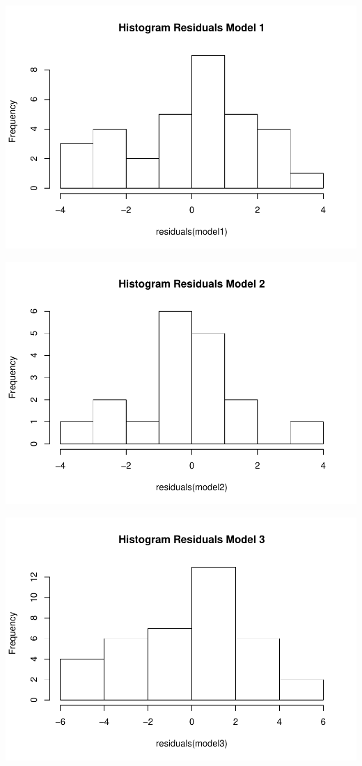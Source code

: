 \documentclass[]{elsarticle} %
\makeatletter
\def\maxwidth{\ifdim\Gin@nat@width>\linewidth\linewidth
\else\Gin@nat@width\fi}
\let\Oldincludegraphics\includegraphics
\renewcommand{\includegraphics}[1]{\Oldincludegraphics[width=\maxwidth]{#1}}
\makeatother
\begin{document}
\includegraphics{refugees-stephanie_files/figure-latex/ggplot_resmodel_1-1.pdf}

\includegraphics{refugees-stephanie_files/figure-latex/ggplot_resmodel_2-1.pdf}

\includegraphics{refugees-stephanie_files/figure-latex/ggplot_resmodel_3-1.pdf}
\end{document}
